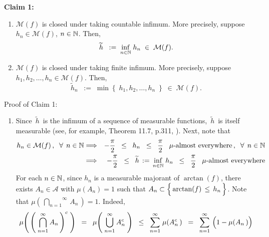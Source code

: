 \begin{enumerate}
	\vskip 0.3cm
	\noindent
	\textbf{Claim 1:}\quad
	\begin{enumerate}
	\item
		$\mathcal{M}(f)$ is closed under taking countable infimum.
		More precisely, suppose $h_{n} \in \mathcal{M}(f)$, $n \in \mathbb{N}$.
		Then,
		\begin{equation*}
		\widetilde{h} \;\; := \; \underset{n\in\mathbb{N}}{\inf}\; h_{n} \;\in\; \mathcal{M}(f).
		\end{equation*}
	\item
		$\mathcal{M}(f)$ is closed under taking finite infimum.
		More precisely, suppose $h_{1}, h_{2}, \ldots, h_{n} \in \mathcal{M}(f)$.
		Then,
		\begin{equation*}
		\widetilde{h}_{n} \;\; := \; \min\!\left\{\;h_{1},h_{2},\ldots,h_{n}\;\right\} \;\in\; \mathcal{M}(f).
		\end{equation*}
	\end{enumerate}
	\vskip 0.1cm
	\noindent
	Proof of Claim 1:
	\begin{enumerate}
	\item
		Since \,$\widetilde{h}$\, is the infimum of a sequence of measurable functions,
		\,$\widetilde{h}$\, is itself measurable (see, for example, Theorem 11.7, p.311, \cite{Rudin1976}).
		Next, note that
		\begin{eqnarray*}
		h_{n} \in \mathcal{M}(f)\,,\;\; \forall\;\, n \in \mathbb{N}
		&\Longrightarrow&
			-\dfrac{\pi}{2} \;\;\leq\;\; h_{n} \;\;\leq\;\; \dfrac{\pi}{2} \;\;\; \mu\textnormal{-almost everywhere}\,,\;\;
			\forall\;\, n \in \mathbb{N}
		\\
		&\Longrightarrow&
			-\dfrac{\pi}{2} \;\;\leq\;\; \widetilde{h} \,:=\, \underset{n\in\mathbb{N}}{\inf}\;h_{n} \;\;\leq\;\; \dfrac{\pi}{2}
			\;\;\; \mu\textnormal{-almost everywhere}
		\end{eqnarray*}
		For each $n \in \mathbb{N}$, since $h_{n}$ is a measurable majorant of $\arctan(f)$,
		there exists $A_{n} \in \mathcal{A}$ with $\mu(A_{n}) = 1$
		such that $A_{n} \subset \left\{\, \arctan(f) \,\overset{{\color{white}.}}{\leq}\, h_{n} \,\right\}$.
		Note that $\mu\!\left(\,\overset{\infty}{\underset{n=1}{\bigcap}}\,A_{n}\,\right) = 1$.
		Indeed,
		\begin{equation*}
		\mu\!\left(\,\left(\;\overset{\infty}{\underset{n=1}{\bigcap}}\,A_{n}\,\right)^{c}\;\right)
		\;\; = \;\;
			\mu\!\left(\;\overset{\infty}{\underset{n=1}{\bigcup}}\,A_{n}^{c}\;\right)
		\;\; \leq \;\;
			\overset{\infty}{\underset{n=1}{\sum}}\;\mu\!\left(A_{n}^{c}\,\right)
		\;\; = \;\;
			\overset{\infty}{\underset{n=1}{\sum}}\,\left(1 \overset{{\color{white}.}}{-} \mu\!\left(A_{n}\,\right)\right)

\end{equation*}
\end{enumerate}
\end{enumerate}
